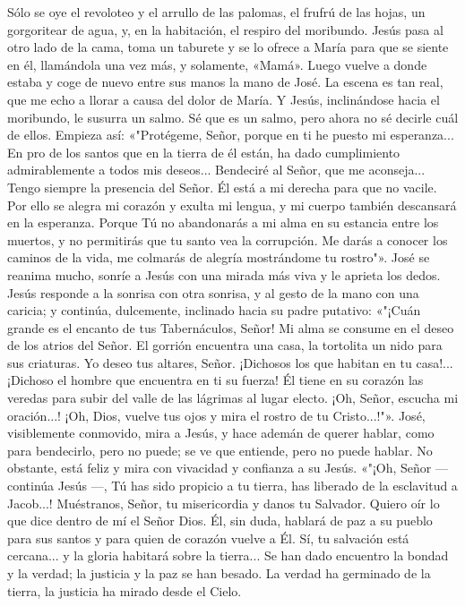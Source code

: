 \documentclass[12pt]{book} %
\begin{document}
Sólo se oye el revoloteo y el arrullo de las palomas, el frufrú de las hojas, un gorgoritear de agua, y, en la habitación, el 
respiro del moribundo. 
Jesús pasa al otro lado de la cama, toma un taburete y se lo ofrece a María para que se siente en él, llamándola una vez más, y solamente, «Mamá». Luego vuelve a donde estaba y coge de nuevo entre sus manos la mano de José. La escena es tan real, que me echo a llorar a causa del dolor de María. 
Y Jesús, inclinándose hacia el moribundo, le susurra un salmo. 
Sé que es un salmo, pero ahora no sé decirle cuál de ellos. Empieza así: 
«"Protégeme, Señor, porque en ti he puesto mi esperanza... 
En pro de los santos que en la tierra de él están, ha dado cumplimiento admirablemente a todos mis deseos... 
Bendeciré al Señor, que me aconseja... 
Tengo siempre la presencia del Señor. Él está a mi derecha para que no vacile. 
Por ello se alegra mi corazón y exulta mi lengua, y mi cuerpo también descansará en la esperanza. 
Porque Tú no abandonarás a mi alma en su estancia entre los muertos, y no permitirás que tu santo vea la corrupción. 
Me darás a conocer los caminos de la vida, me colmarás de alegría mostrándome tu rostro"». 
José se reanima mucho, sonríe a Jesús con una mirada más viva y le aprieta los dedos. 
Jesús responde a la sonrisa con otra sonrisa, y al gesto de la mano con una caricia; y continúa, dulcemente, inclinado 
hacia su padre putativo:      
«"¡Cuán grande es el encanto de tus Tabernáculos, Señor! 
Mi alma se consume en el deseo de los atrios del Señor. 
El gorrión encuentra una casa, la tortolita un nido para sus criaturas. Yo deseo tus altares, Señor. 
¡Dichosos los que habitan en tu casa!... ¡Dichoso el hombre que encuentra en ti su fuerza! Él tiene en su corazón las 
veredas para subir del valle de las lágrimas al lugar electo. 
¡Oh, Señor, escucha mi oración...! 
¡Oh, Dios, vuelve tus ojos y mira el rostro de tu Cristo...!"». 
José, visiblemente conmovido, mira a Jesús, y hace ademán de querer hablar, como para bendecirlo, pero no puede; se 
ve que entiende, pero no puede hablar. No obstante, está feliz y mira con vivacidad y confianza a su Jesús. 
«"¡Oh, Señor — continúa Jesús —, Tú has sido propicio a tu tierra, has liberado de la esclavitud a Jacob...! 
Muéstranos, Señor, tu misericordia y danos tu Salvador. 
Quiero oír lo que dice dentro de mí el Señor Dios. Él, sin duda, hablará de paz a su pueblo para sus santos y para quien 
de corazón vuelve a Él. 
Sí, tu salvación está cercana... y la gloria habitará sobre la tierra... Se han dado encuentro la bondad y la verdad; la 
justicia y la paz se han besado. La verdad ha germinado de la tierra, la justicia ha mirado desde el Cielo. 
\end{document}
